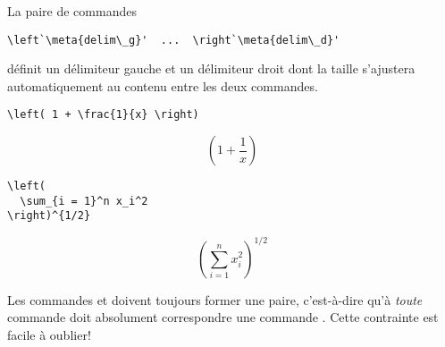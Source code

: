 La paire de commandes
\begin{lstlisting}
\left`\meta{delim\_g}'  ...  \right`\meta{delim\_d}'
\end{lstlisting}
définit un délimiteur gauche  et un délimiteur droit
 dont la taille s'ajustera automatiquement au contenu
entre les deux commandes.
\begin{demo}
  \begin{texample}
\begin{lstlisting}
\left( 1 + \frac{1}{x} \right)
\end{lstlisting}
    \producing
    \begin{equation*}
      \left( 1 + \frac{1}{x} \right)
    \end{equation*}
  \end{texample}

  \begin{texample}
\begin{lstlisting}
\left(
  \sum_{i = 1}^n x_i^2
\right)^{1/2}
\end{lstlisting}
    \producing
    \begin{equation*}
      \left(
        \sum_{i = 1}^n x_i^2
      \right)^{1/2}
    \end{equation*}
  \end{texample}
\end{demo}
Les commandes \cmd{\left} et \cmd{\right} doivent toujours former une
paire, c'est-à-dire qu'à \emph{toute} commande \cmdprint{\left} doit
  absolument correspondre une commande \cmdprint{\right}. Cette
contrainte est facile à oublier!

